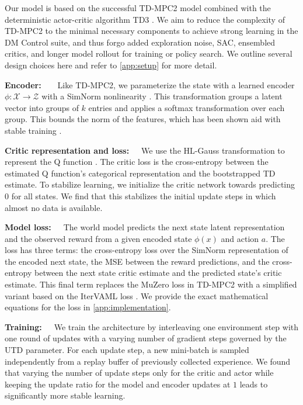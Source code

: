 Our model is based on the successful TD-MPC2 model \parencite{hansen2024tdmpc} combined with the deterministic actor-critic algorithm TD3 \parencite{fujimoto2018addressing}.
We aim to reduce the complexity of TD-MPC2 to the minimal necessary components to achieve strong learning in the DM Control suite, and thus forgo added exploration noise, SAC, ensembled critics, and longer model rollout for training or policy search. We outline several design choices here and refer to \autoref{app:setup} for more detail.

\textbf{Encoder:}~~~~Like TD-MPC2, we parameterize the state with a learned encoder $\phi: \mathcal{X} \rightarrow \mathcal{Z}$ with a SimNorm nonlinearity \parencite{lavoie2023simplicial}. 
This transformation groups a latent vector into groups of $k$ entries and applies a softmax transformation over each group.
This bounds the norm of the features, which has been shown aid with stable training \parencite{hussing2024dissecting,nauman2024overestimation}.

\textbf{Critic representation and loss:}~~~We use the HL-Gauss transformation to represent the Q function \parencite{farebrother2024stop}. The critic loss is the cross-entropy between the estimated Q function's categorical representation and the bootstrapped TD estimate.
To stabilize learning, we initialize the critic network towards predicting $0$ for all states.
We find that this stabilizes the initial update steps in which almost no data is available.

\textbf{Model loss:}~~~The world model predicts the next state latent representation and the observed reward from a given encoded state $\phi(x)$ and action $a$. The loss has three terms: the cross-entropy loss over the SimNorm representation of the encoded next state, the MSE between the reward predictions, and the cross-entropy between the next state critic estimate and the predicted state's critic estimate.
This final term replaces the MuZero loss in TD-MPC2 with a simplified variant based on the IterVAML loss \parencite{itervaml}.
We provide the exact mathematical equations for the loss in \autoref{app:implementation}.


\textbf{Training:}~~~We train the architecture by interleaving one environment step with one round of updates with a varying number of gradient steps governed by the UTD parameter.
For each update step, a new mini-batch is sampled independently from a replay buffer of previously collected experience.
We found that varying the number of update steps only for the critic and actor while keeping the update ratio for the model and encoder updates at $1$ leads to significantly more stable learning.

